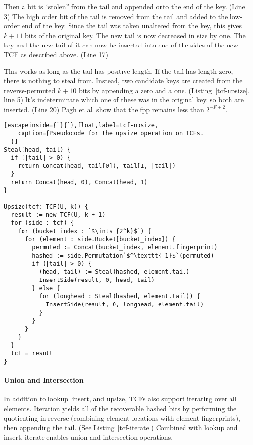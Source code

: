 \documentclass[letterpaper,twocolumn,10pt]{article}
\newcommand{\ints}{\mathbb{Z}}
\newcommand{\etal}{et al.}
\begin{document}
Then a bit is ``stolen'' from the tail and appended onto the end of the key. (Line 3)
The high order bit of the tail is removed from the tail and added to the low-order end of the key.
Since the tail was taken unaltered from the key, this gives $k+11$ bits of the original key.
The new tail is now decreased in size by one.
The key and the new tail of it can now be inserted into one of the sides of the new TCF as described above. (Line 17)

This works as long as the tail has positive length.
If the tail has length zero, there is nothing to steal from.
Instead, two candidate keys are created from the reverse-permuted $k+10$ bits by appending a zero and a one. (Listing~\ref{tcf-upsize}, line 5)
It's indeterminate which one of these was in the original key, so both are inserted. (Line 20)
Pagh \etal{} show that the fpp remains less than $2^{-F+2}$.~\cite{psw}

\begin{lstlisting}[escapeinside={`}{`},float,label=tcf-upsize,
    caption={Pseudocode for the upsize operation on TCFs.
  }]
Steal(head, tail) {
  if (|tail| > 0) {
    return Concat(head, tail[0]), tail[1, |tail|)
  }
  return Concat(head, 0), Concat(head, 1)
}

Upsize(tcf: TCF(U, k)) {
  result := new TCF(U, k + 1)
  for (side : tcf) {
    for (bucket_index : `$\ints_{2^k}$`) {
      for (element : side.Bucket[bucket_index]) {
        permuted := Concat(bucket_index, element.fingerprint)
        hashed := side.Permutation`$^\texttt{-1}$`(permuted)
        if (|tail| > 0) {
          (head, tail) := Steal(hashed, element.tail)
          InsertSide(result, 0, head, tail)
        } else {
          for (longhead : Steal(hashed, element.tail)) {
            InsertSide(result, 0, longhead, element.tail)
          }
        }
      }
    }
  }
  tcf = result
}
\end{lstlisting}

\paragraph{Union and Intersection}
In addition to lookup, insert, and upsize, TCFs also support iterating over all elements.
Iteration yields all of the recoverable hashed bits by performing the quotienting in reverse (combining element locations with element fingerprints), then appending the tail. (See Listing~\ref{tcf-iterate})
Combined with lookup and insert, iterate enables union and intersection operations.
\end{document}
